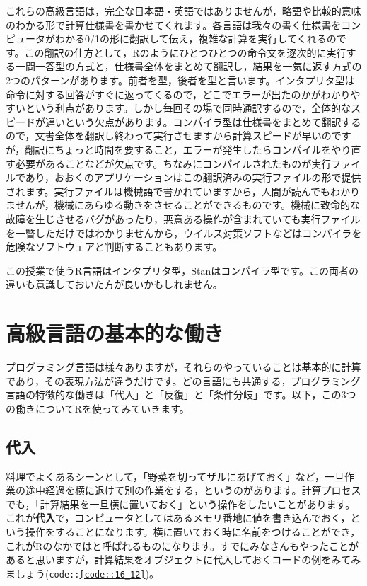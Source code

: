 \documentclass{ltjsbook}
\begin{document}
これらの高級言語は，完全な日本語・英語ではありませんが，略語や比較的意味のわかる形で計算仕様書を書かせてくれます。各言語は我々の書く仕様書をコンピュータがわかる0/1の形に翻訳して伝え，複雑な計算を実行してくれるのです。この翻訳の仕方として，Rのようにひとつひとつの命令文を逐次的に実行する一問一答型の方式と，仕様書全体をまとめて翻訳し，結果を一気に返す方式の2つのパターンがあります。前者を型，後者を型と言います。インタプリタ型は命令に対する回答がすぐに返ってくるので，どこでエラーが出たのかがわかりやすいという利点があります。しかし毎回その場で同時通訳するので，全体的なスピードが遅いという欠点があります。コンパイラ型は仕様書をまとめて翻訳するので，文書全体を翻訳し終わって実行させますから計算スピードが早いのですが，翻訳にちょっと時間を要すること，エラーが発生したらコンパイルをやり直す必要があることなどが欠点です。ちなみにコンパイルされたものが実行ファイルであり，おおくのアプリケーションはこの翻訳済みの実行ファイルの形で提供されます。実行ファイルは機械語で書かれていますから，人間が読んでもわかりませんが，機械にあらゆる動きをさせることができるものです。機械に致命的な故障を生じさせるバグがあったり，悪意ある操作が含まれていても実行ファイルを一瞥しただけではわかりませんから，ウイルス対策ソフトなどはコンパイラを危険なソフトウェアと判断することもあります。

この授業で使うR言語はインタプリタ型，Stanはコンパイラ型です。この両者の違いも意識しておいた方が良いかもしれません。

\section{高級言語の基本的な働き}
プログラミング言語は様々ありますが，それらのやっていることは基本的に計算であり，その表現方法が違うだけです。どの言語にも共通する，プログラミング言語の特徴的な働きは「代入」と「反復」と「条件分岐」です。以下，この3つの働きについてRを使ってみていきます。
\subsection{代入}
料理でよくあるシーンとして，「野菜を切ってザルにあげておく」など，一旦作業の途中経過を横に退けて別の作業をする，というのがあります。計算プロセスでも，「計算結果を一旦横に置いておく」という操作をしたいことがあります。これが\textbf{代入}で，コンピュータとしてはあるメモリ番地に値を書き込んでおく，という操作をすることになります。横に置いておく時に名前をつけることができ，これがRのなかではと呼ばれるものになります。すでにみなさんもやったことがあると思いますが，計算結果をオブジェクトに代入しておくコードの例をみてみましょう(\texttt{code::\ref{code::16_12}})。
\end{document}
